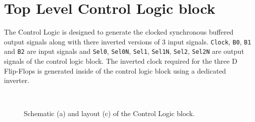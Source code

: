 \documentclass[parskip,oneside,colorbacktitle,10pt,accentcolor=tud1b]{tudreport}
\begin{document}
{\section{Top Level Control Logic block}

The Control Logic is designed to generate the clocked synchronous buffered output signals along with there inverted versions of 3 input signals. \texttt{Clock}, \texttt{B0}, \texttt{B1} and \texttt{B2} are input signals and \texttt{Sel0}, \texttt{Sel0N}, \texttt{Sel1}, \texttt{Sel1N}, \texttt{Sel2}, \texttt{Sel2N} are output signals of the control logic block. The inverted clock required for the three D Flip-Flops is generated inside of the control logic block using a dedicated inverter. 

\begin{figure}[H]
     \begin{center}
        \\
        \caption{Schematic (a) and layout (c) of the Control Logic block.}
        \label{fig:ctrl_top}
    \end{center}
\end{figure}

}
\end{document}
